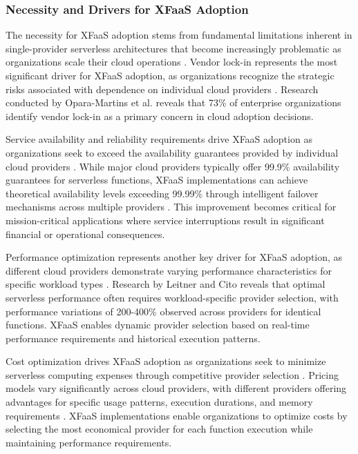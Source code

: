 \documentclass[onecolumn]{IEEEtran}
\begin{document}
\subsubsection{Necessity and Drivers for XFaaS Adoption}

The necessity for XFaaS adoption stems from fundamental limitations inherent in single-provider serverless architectures that become increasingly problematic as organizations scale their cloud operations \cite{eismann2020review}. Vendor lock-in represents the most significant driver for XFaaS adoption, as organizations recognize the strategic risks associated with dependence on individual cloud providers \cite{petcu2013consuming}. Research conducted by Opara-Martins et al. \cite{opara2016critical} reveals that 73\% of enterprise organizations identify vendor lock-in as a primary concern in cloud adoption decisions.

Service availability and reliability requirements drive XFaaS adoption as organizations seek to exceed the availability guarantees provided by individual cloud providers \cite{van2017distributed}. While major cloud providers typically offer 99.9\% availability guarantees for serverless functions, XFaaS implementations can achieve theoretical availability levels exceeding 99.99\% through intelligent failover mechanisms across multiple providers \cite{wang2018peeking}. This improvement becomes critical for mission-critical applications where service interruptions result in significant financial or operational consequences.

Performance optimization represents another key driver for XFaaS adoption, as different cloud providers demonstrate varying performance characteristics for specific workload types \cite{shahrad2020serverless}. Research by Leitner and Cito \cite{leitner2016patterns} reveals that optimal serverless performance often requires workload-specific provider selection, with performance variations of 200-400\% observed across providers for identical functions. XFaaS enables dynamic provider selection based on real-time performance requirements and historical execution patterns.

Cost optimization drives XFaaS adoption as organizations seek to minimize serverless computing expenses through competitive provider selection \cite{adzic2017serverless}. Pricing models vary significantly across cloud providers, with different providers offering advantages for specific usage patterns, execution durations, and memory requirements \cite{eismann2020review}. XFaaS implementations enable organizations to optimize costs by selecting the most economical provider for each function execution while maintaining performance requirements.
\end{document}
